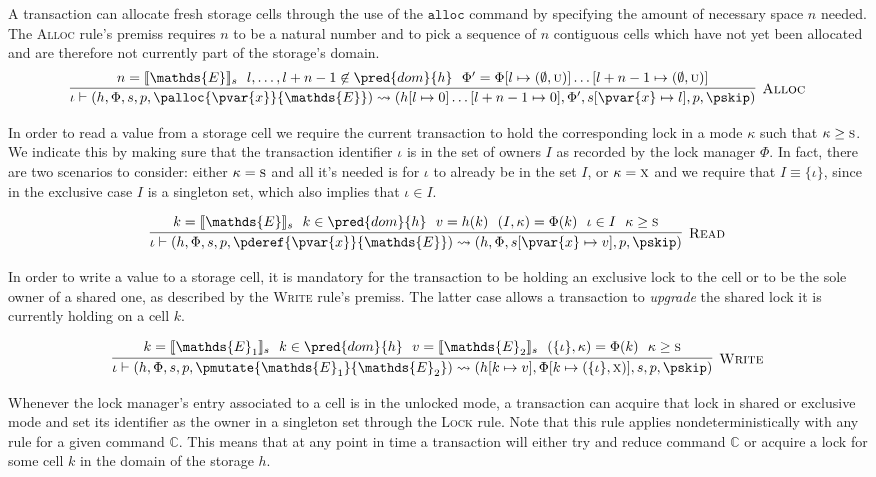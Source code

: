 A transaction can allocate fresh storage cells through the use of the $\mathtt{alloc}$ command by specifying the amount of necessary space $n$ needed. The \textsc{Alloc} rule's premiss requires $n$ to be a natural number and to pick a sequence of $n$ contiguous cells which have not yet been allocated and are therefore not currently part of the storage's domain.
\[
\infer[\textsc{Alloc}]
{
	\iota \vdash (h, \Phi, s, p, \palloc{\pvar{x}}{\mathds{E}})
	\rightsquigarrow
	(h[l \mapsto 0] \ldots [l + n - 1 \mapsto 0], \Phi', s[\pvar{x} \mapsto l], p, \pskip)
}
{
	n = \llbracket \mathds{E} \rrbracket_s\ \
	l, \ldots, l + n - 1 \not\in \pred{dom}{h}\ \
	\Phi' = \Phi[l \mapsto (\emptyset, \textsc{u})]\ldots[l + n - 1 \mapsto (\emptyset, \textsc{u})]
}
\]

In order to read a value from a storage cell we require the current transaction to hold the corresponding lock in a mode $\kappa$ such that $\kappa \geq \textsc{s}$. We indicate this by making sure that the transaction identifier $\iota$ is in the set of owners $I$ as recorded by the lock manager $\Phi$. In fact, there are two scenarios to consider: either $\kappa = \textsc{s}$ and all it's needed is for $\iota$ to already be in the set $I$, or $\kappa = \textsc{x}$ and we require that $I \equiv \{ \iota \}$, since in the exclusive case $I$ is a singleton set, which also implies that $\iota \in I$.

\[
\infer[\textsc{Read}]
{
	\iota \vdash (h, \Phi, s, p, \pderef{\pvar{x}}{\mathds{E}})
	\rightsquigarrow
	(h, \Phi, s[\pvar{x} \mapsto v], p, \pskip)
}
{
	k = \llbracket \mathds{E} \rrbracket_s\ \
	k \in \pred{dom}{h}\ \
	v = h(k)\ \
	(I, \kappa) = \Phi(k)\ \
	\iota \in I\ \
	\kappa \geq \textsc{s}
}
\]

In order to write a value to a storage cell, it is mandatory for the transaction to be holding an exclusive lock to the cell or to be the sole owner of a shared one, as described by the \textsc{Write} rule's premiss. The latter case allows a transaction to \textit{upgrade} the shared lock it is currently holding on a cell $k$.

\[
\infer[\textsc{Write}]
{
	\iota \vdash (h, \Phi, s, p, \pmutate{\mathds{E}_1}{\mathds{E}_2})
	\rightsquigarrow
	(h[k \mapsto v], \Phi[k \mapsto (\{\iota\}, \textsc{x})], s, p, \pskip)
}
{
	k = \llbracket \mathds{E}_1 \rrbracket_s\ \
	k \in \pred{dom}{h}\ \
	v = \llbracket \mathds{E}_2 \rrbracket_s\ \
	(\{ \iota \}, \kappa) = \Phi(k)\ \
	\kappa \geq \textsc{s}
}
\]

Whenever the lock manager's entry associated to a cell is in the unlocked mode, a transaction can acquire that lock in shared or exclusive mode and set its identifier as the owner in a singleton set through the \textsc{Lock} rule. Note that this rule applies nondeterministically with any rule for a given command $\mathds{C}$. This means that at any point in time a transaction will either try and reduce command $\mathds{C}$ or acquire a lock for some cell $k$ in the domain of the storage $h$.

